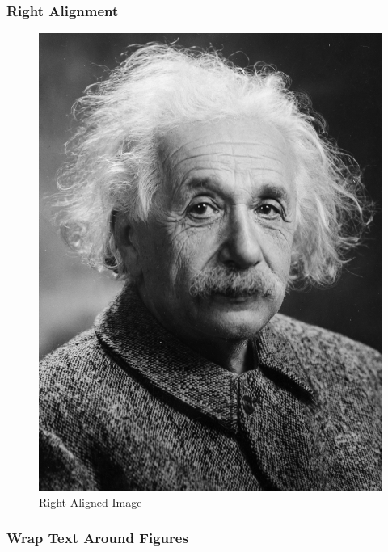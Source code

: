 \documentclass[twocolumn]{article}
\begin{document}
\subsubsection{Right Alignment}
\begin{figure}[htbp]
    \hfill
    \includegraphics[]{Images/Albert_Einstein.png}
    \caption{Right Aligned Image}
    \label{fig:enter-label}
\end{figure}
\pagebreak


\subsubsection{Wrap Text Around Figures}
\end{document}
